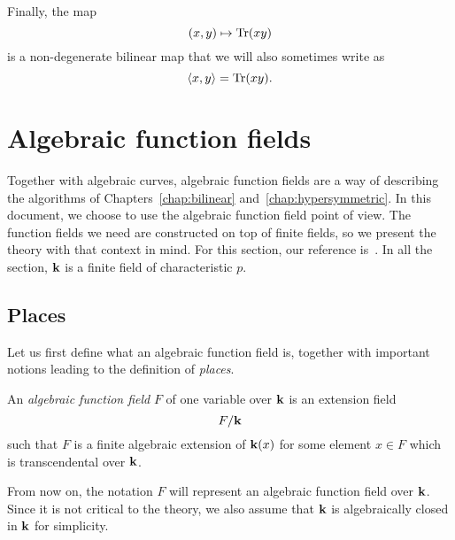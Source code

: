 Finally, the map
\[
  (x, y)\mapsto\operatorname{Tr}(xy)
\]
is a non-degenerate bilinear map that we will also sometimes write as
\[
  \left\langle x,y\right\rangle = \operatorname{Tr}(xy).
\]
%
%

\section{Algebraic function fields}
\label{sec:algebraic-function-fields}

%

Together with algebraic curves, algebraic function fields are a way of
describing the algorithms of Chapters~\ref{chap:bilinear}
and~\ref{chap:hypersymmetric}. In this document, we choose to use the algebraic
function field point of view. The function fields we need are constructed
on top of finite fields, so we present the theory with that context in mind. For
this section, our reference is~\cite{Stichtenoth09}. In all the section, $\mathbf{k}$ is
a finite field of characteristic $p$.

\subsection{Places}

Let us first define what an algebraic function field is, together with important
notions leading to the definition of \emph{places}.
\begin{defi}
  An \emph{algebraic function field} $F$ of one variable over $\mathbf{k}$ is an
  extension field 
  \[
    F/\mathbf{k}
  \]
  such that $F$ is a finite algebraic extension of
  $\mathbf{k}(x)$ for some element $x\in F$ which is transcendental over $\mathbf{k}$.
\end{defi}
From now on, the notation $F$ will represent an algebraic function field over
$\mathbf{k}$. Since it is not critical to the theory, we also assume that $\mathbf{k}$ is
algebraically closed in $\mathbf{k}$ for simplicity.

